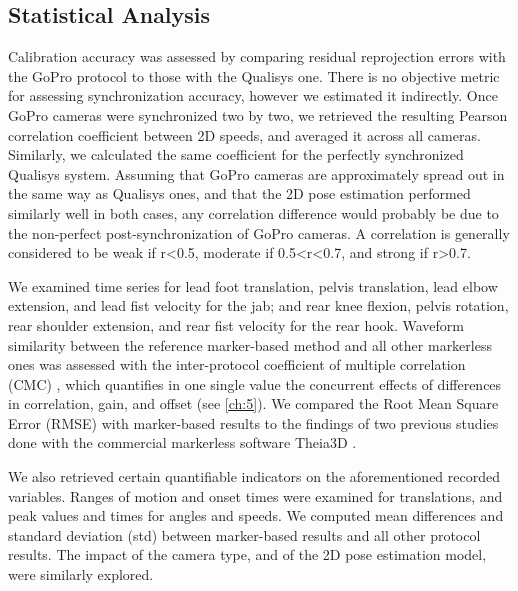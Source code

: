 \subsection{Statistical Analysis}

Calibration accuracy was assessed by comparing residual reprojection errors with the GoPro protocol to those with the Qualisys one. There is no objective metric for assessing synchronization accuracy, however we estimated it indirectly. Once GoPro cameras were synchronized two by two, we retrieved the resulting Pearson correlation coefficient between 2D speeds, and averaged it across all cameras. Similarly, we calculated the same coefficient for the perfectly synchronized Qualisys system. Assuming that GoPro cameras are approximately spread out in the same way as Qualisys ones, and that the 2D pose estimation performed similarly well in both cases, any correlation difference would probably be due to the non-perfect post-synchronization of GoPro cameras. A correlation is generally considered to be weak if r<0.5, moderate if 0.5<r<0.7, and strong if r>0.7.

We examined time series for lead foot translation, pelvis translation, lead elbow extension, and lead fist velocity for the jab; and rear knee flexion, pelvis rotation, rear shoulder extension, and rear fist velocity for the rear hook. 
Waveform similarity between the reference marker-based method and all other markerless ones was assessed with the inter-protocol coefficient of multiple correlation (CMC) \cite{Ferrari2010}, which quantifies in one single value the concurrent effects of differences in correlation, gain, and offset (see  \autoref{ch:5}). We compared the Root Mean Square Error (RMSE) with marker-based results to the findings of two previous studies done with the commercial markerless software Theia3D \cite{Kanko2021b}.

\newpage
We also retrieved certain quantifiable indicators on the aforementioned recorded variables. Ranges of motion and onset times were examined for translations, and peak values and times for angles and speeds. 
We computed mean differences and standard deviation (std) between marker-based results and all other protocol results. The impact of the camera type, and of the 2D pose estimation model, were similarly explored. 

